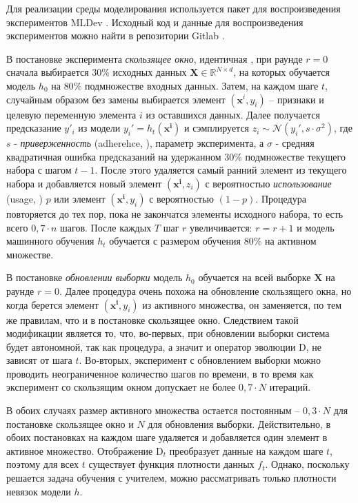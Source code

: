     Для реализации среды моделирования используется пакет для воспроизведения экспериментов MLDev \citep{khritankov2021mldev}. Исходный код и данные для воспроизведения экспериментов можно найти в репозитории Gitlab \footnotemark.


    В постановке эксперимента \emph{скользящее окно}, идентичная \citep{khritankov2023positive}, при раунде $r = 0$ сначала выбирается $30\%$ исходных данных $\textbf{X} \in \mathbb{R}^{N \times d}$, на которых обучается модель $h_0$ на $80\%$ подмножестве входных данных.   
    Затем, на каждом шаге $t$, случайным образом без замены выбирается элемент $(\mathbf{x}^i, y_i)$ -- признаки и целевую переменную элемента $i$ из оставшихся данных. Далее получается предсказание $y'_i$ из модели $y_i' = h_t(\mathbf{x^i})$ и сэмплируется $z_i \sim \mathcal{N}(y_i', s \cdot \sigma^2)$, где $s$ - \emph{приверженность} (adherehce,  \citep{khritankov2023positive}), параметр эксперимента, а $\sigma$ - средняя квадратичная ошибка предсказаний на удержанном $30\%$ подмножестве текущего набора с шагом $t - 1$. После этого удаляется самый ранний элемент из текущего набора и добавляется новый элемент $(\mathbf{x^i}, z_i)$ с вероятностью \emph{использование} (usage,  \citep{khritankov2023positive}) $p$ или элемент $(\mathbf{x^i}, y_i)$ с вероятностью $(1-p)$. Процедура повторяется до тех пор, пока не закончатся элементы исходного набора, то есть всего $0,7 \cdot n$ шагов. После каждых $T$ шаг $r$ увеличивается: $r = r + 1$ и модель машинного обучения $h_t$ обучается с размером обучения $80\%$ на активном множестве.

    В постановке \emph{обновлении выборки} модель $h_0$ обучается на всей выборке $\textbf{X}$ на раунде $r = 0$. Далее процедура очень похожа на обновление скользящего окна, но когда берется элемент $(\mathbf{x^i}, y_i)$ из активного множества, он заменяется, по тем же правилам, что и в постановке скользящее окно. Следствием такой модификации является то, что, во-первых, при обновлении выборки система будет автономной, так как процедура, а значит и оператор эволюции $\text{D}$, не зависят от шага $t$. Во-вторых, эксперимент с обновлением выборки можно проводить неограниченное количество шагов по времени, в то время как эксперимент со скользящим окном допускает не более $0,7 \cdot N$ итераций. 

    В обоих случаях размер активного множества остается постоянным -- $0,3 \cdot N$ для постановке скользящее окно и $N$ для обновления выборки. Действительно, в обоих постановках на каждом шаге удаляется и добавляется один элемент в активное множество. Отображение $\text{D}_t$ преобразует данные на каждом шаге $t$, поэтому для всех $t$ существует функция плотности данных $f_t$. Однако, поскольку решается задача обучения с учителем, можно рассматривать только плотности невязок модели $h$. 

